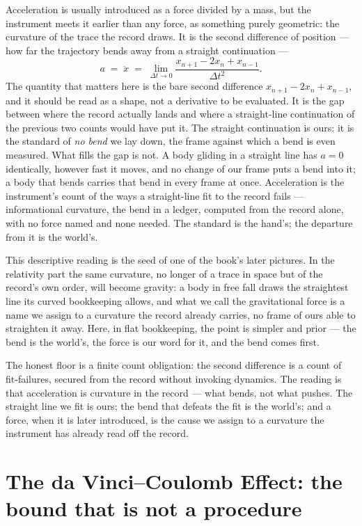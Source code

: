 Acceleration is usually introduced as a force divided by a mass, but the instrument meets it earlier than any
force, as something purely geometric: the curvature of the trace the record draws. It is the second difference
of position --- how far the trajectory bends away from a straight continuation ---
\begin{equation}
  a \;=\; \ddot{x} \;=\; \lim_{\Delta t \to 0}\frac{x_{n+1} - 2x_n + x_{n-1}}{\Delta t^2}.
\end{equation}
The quantity that matters here is the bare second difference $x_{n+1} - 2x_n + x_{n-1}$, and it should be read
as a shape, not a derivative to be evaluated. It is the gap between where the record actually lands and where a
straight-line continuation of the previous two counts would have put it. The straight continuation is ours: it
is the standard of \emph{no bend} we lay down, the frame against which a bend is even measured. What fills the
gap is not. A body gliding in a straight line has $a = 0$ identically, however fast it moves, and no change of
our frame puts a bend into it; a body that bends carries that bend in every frame at once. Acceleration is the
instrument's count of the ways a straight-line fit to the record fails --- informational curvature, the bend in
a ledger, computed from the record alone, with no force named and none needed. The standard is the hand's; the
departure from it is the world's.

This descriptive reading is the seed of one of the book's later pictures. In the relativity part the same
curvature, no longer of a trace in space but of the record's own order, will become gravity: a body in free
fall draws the straightest line its curved bookkeeping allows, and what we call the gravitational force is a
name we assign to a curvature the record already carries, no frame of ours able to straighten it away. Here, in
flat bookkeeping, the point is simpler and prior --- the bend is the world's, the force is our word for it, and
the bend comes first.

The honest floor is a finite count obligation: the second difference is a count of fit-failures, secured from
the record without invoking dynamics. The reading is that acceleration is curvature in the record --- what
bends, not what pushes. The straight line we fit is ours; the bend that defeats the fit is the world's; and a
force, when it is later introduced, is the cause we assign to a curvature the instrument has already read off
the record.

\section{The da Vinci--Coulomb Effect: the bound that is not a procedure}
\label{se:davinci-coulomb}


